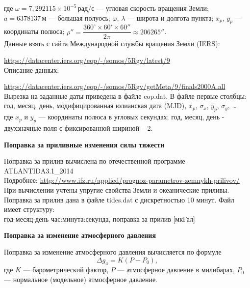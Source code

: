 \documentclass[11pt, a4paper,addpoints]{exam}
\theoremstyle{remark}
\renewcommand{\phi}{\ensuremath{\varphi}}
\begin{document}
        где $\omega = 7,292115\times 10^{-5}\,\text{рад/с}$ --- угловая скорость вращения Земли; $a
        = 6378137\,\text{м}$ --- большая полуось; $\phi$, $\lambda$ --- широта
        и долгота пункта; $x_p$, $y_p$ --- координаты полюса; $\rho'' = \dfrac{360^\circ \times 60'
        \times 60''}{2\pi} \approx 206265''$.\\
        Данные взять с сайта Международной службы вращения Земли (IERS):\par
        \url{https://datacenter.iers.org/eop/-/somos/5Rgv/latest/9}\\
        Описание данных:\par
        \url{https://datacenter.iers.org/eop/-/somos/5Rgv/getMeta/9/finals2000A.all} \\
        Вырезка на заданные даты приведена в файле \textrm{eop.dat}. В файле первые столбцы:\\
        год, месяц, день, модифицированная юлианская дата (MJD), $x_p$, $\sigma_x$, $y_p$, $\sigma_y$, \dots\\ 
        где $x_p$ и  $y_p$ --- координаты полюса в угловых секундах; год, месяц, день - двухзначные поля
        с фиксированной шириной -- 2. 
\begin{flushleft}
    \textbf{Поправка за приливные изменения силы тяжести} 
\end{flushleft}
Поправка за прилив вычислена по отечественной программе ATLANTIDA3.1\_2014 \\
Подробнее: \url{http://www.ifz.ru/applied/prognoz-parametrov-zemnykh-prilivov/}\\
При вычислении учтены упругие свойства Земли и океанические приливы.\\
Поправка за прилив дана в файле \textrm{tides.dat} с дискретностью 10 минут. Файл имеет структуру:\\
год-месяц-день час:минута:секунда, поправка за прилив [мкГал]\\

\begin{flushleft}
    \textbf{Поправка за изменение атмосферного давления} 
\end{flushleft}

Поправка за изменение атмосферного давления вычисляется по формуле
\begin{equation*}
    \Delta g_a = K \left( P - P_0 \right),
\end{equation*}
где $K$ --- барометрический фактор, $P$ --- атмосферное давление в милибарах, $P_0$ --- нормальное
(модельное) атмосферное давление.
\end{document}
